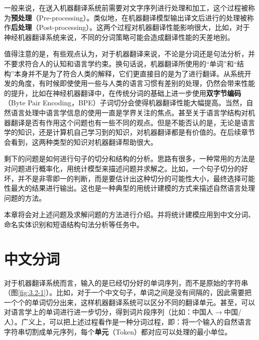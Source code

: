 \parinterval 一般来说，在送入机器翻译系统前需要对文字序列进行处理和加工，这个过程被称为{\small\sffamily\bfseries{预处理}}（Pre-processing）。类似地，在机器翻译模型输出译文后进行的处理被称作{\small\sffamily\bfseries{后处理}}（Post-processing）。这两个过程对机器翻译性能影响很大，比如，对于神经机器翻译系统来说，不同的分词策略可能会造成翻译性能的天差地别。

\parinterval 值得注意的是，有些观点认为，对于机器翻译来说，不论是分词还是句法分析，并不要求符合人的认知和语言学约束。换句话说，机器翻译所使用的“单词”和“结构”本身并不是为了符合人类的解释，它们更直接目的是为了进行翻译。从系统开发的角度，有时候即使使用一些与人类的语言习惯有差别的处理，仍然会带来性能的提升，比如在神经机器翻译中，在传统分词的基础上进一步使用{\small\sffamily\bfseries{双字节编码}}（Byte Pair Encoding，BPE）子词切分会使得机器翻译性能大幅提高。当然，自然语言处理中语言学信息的使用一直是学界关注的焦点。甚至关于语言学结构对机器翻译是否有作用这个问题也有一些不同的观点。但是不能否认的是，无论是语言学的知识，还是计算机自己学习到的知识，对机器翻译都是有价值的。在后续章节会看到，这两种类型的知识对机器翻译帮助很大。

\parinterval 剩下的问题是如何进行句子的切分和结构的分析。思路有很多，一种常用的方法是对问题进行概率化，用统计模型来描述问题并求解之。比如，一个句子切分的好坏，并不是非零即一的判断，而是要估计出这种切分的可能性大小，最终选择可能性最大的结果进行输出。这也是一种典型的用统计建模的方式来描述自然语言处理问题的方法。

\parinterval 本章将会对上述问题及求解问题的方法进行介绍。并将统计建模应用到中文分词、命名实体识别和短语结构句法分析等任务中。

\sectionnewpage
\section{中文分词}

\parinterval 对于机器翻译系统而言，输入的是已经切分好的单词序列，而不是原始的字符串（图\ref{fig:3.2-1}）。比如，对于一个中文句子，单词之间是没有间隔的，因此需要把一个个的单词切分出来，这样机器翻译系统可以区分不同的翻译单元。甚至，可以对语言学上的单词进行进一步切分，得到词片段序列（比如：中国人$\to$中国/人）。广义上，可以把上述过程看作是一种分词过程，即：将一个输入的自然语言字符串切割成单元序列，每个{\small\sffamily\bfseries{单元}}（Token）都对应可以处理的最小单位。

